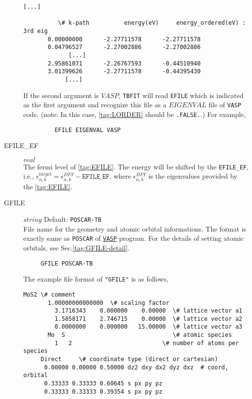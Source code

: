 \documentclass[a4paper,12pt]{scrartcl}
\makeatletter
\def\namedlabel#1#2{\begingroup
    #2%
    \def\@currentlabel{#2}%
    \phantomsection\label{#1}\endgroup
}
\newcommand{\tbfitname}{\textcolor{blue!85!white}{\texttt{TBFIT}}}
\makeatother
\begin{document}
\begin{description}
\begin{Verbatim}[commandchars=\\\{\},gobble=4, frame=single, framesep=2mm, 
		   	label= EFILE DFT\_BANDSTRUCTURE\_ORDERED.out example ,
		   	labelposition=bottomline]
            [...]
            
		  \# k-path          energy(eV)     energy_ordered(eV) : 3rd eig
       0.00000000      -2.27711578      -2.27711578
       0.04796527      -2.27002886      -2.27002886
             [...]
       2.95861071      -2.26767593      -0.44510940
       3.01399626      -2.27711578      -0.44395430    
            [...]
		\end{Verbatim}
		
    	If the second argument is $VASP$,
		\tbfitname{} will read \texttt{EFILE} which is indicated as the first argument and recognize this file as a $EIGENVAL$ file of \texttt{VASP} code. (note: In this case, \ref{tag:LORDER} should be \texttt{.FALSE.}.) For example, 

		\begin{verbatim}
		 EFILE EIGENVAL VASP
		\end{verbatim}

	    \item[\namedlabel{tag:EFILE_EF}{EFILE\_EF}] $real$ \\
	    The fermi level of \ref{tag:EFILE}. The energy will be shifted by the \texttt{EFILE\_EF}, i.e., $\epsilon_{n,k}^{target} = \epsilon_{n,k}^{DFT} - \texttt{EFILE\_EF}$, where $\epsilon_{n,k}^{DFT}$ is the eigenvalues provided by the \ref{tag:EFILE}.

	
    \item[\namedlabel{tag:GFILE}{GFILE}] $string$ Default: \texttt{POSCAR-TB} \\
        File name for the geometry and atomic orbital informations. 
		The format is exactly same as \texttt{POSCAR} of \href{https://www.vasp.at}{\texttt{VASP}}
		program. For the details of setting atomic orbitals, see Sec.\ref{tag:GFILE-detail}.

    \begin{verbatim}
     GFILE POSCAR-TB
    \end{verbatim}
       
       The example file format of \texttt{"GFILE"} is as follows,

        \begin{Verbatim}[commandchars=\\\{\},gobble=4, frame=single, framesep=2mm, 
            label= POSCAR-TB example: MoS$_2$ with \texttt{Mo}-$d$ and \texttt{S}-$s$$p$,
            labelposition=bottomline]
     MoS2 \# comment
       1.00000000000000  \# scaling factor
         3.1716343    0.000000    0.00000  \# lattice vector a1
         1.5858171    2.746715    0.00000  \# lattice vector a2
         0.0000000    0.000000   15.00000  \# lattice vector a3
       Mo  S                               \# atomic species
         1   2                          \# number of atoms per species
     Direct     \# coordinate type (direct or cartesian)
      0.00000 0.00000 0.50000 dz2 dxy dx2 dyz dxz  # coord, orbital
      0.33333 0.33333 0.60645 s px py pz              
      0.33333 0.33333 0.39354 s px py pz


\end{Verbatim}
\end{description}
\end{document}
